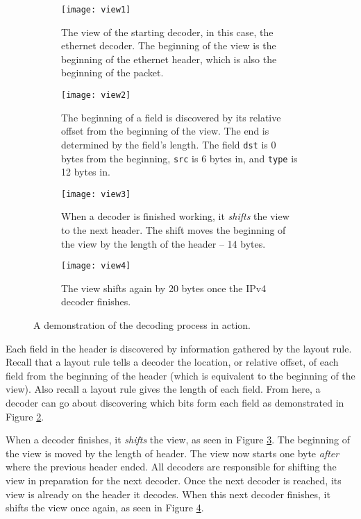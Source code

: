 \begin{figure}[ht]
\begin{subfigure}[t]{.45\textwidth}
  \centering
  \texttt{[image: view1]}
  \caption{The view of the starting decoder, in this case, the ethernet
decoder. The beginning of the view is the beginning of the ethernet
header, which is also the beginning of the packet.}
  \label{fg:view1}
\end{subfigure}%
\hfill
\begin{subfigure}[t]{.45\textwidth}
  \centering
  \texttt{[image: view2]}
  \caption{The beginning of a field is discovered by its relative offset from
the beginning of the view. The end is determined by the field's length. The
field \texttt{dst} is 0 bytes from the beginning, \texttt{src} is 6 bytes in,
and \texttt{type} is 12 bytes in.}
  \label{fg:view2}
\end{subfigure}

\begin{subfigure}[t]{.45\textwidth}
  \centering
  \texttt{[image: view3]}
  \caption{When a decoder is finished working, it \textit{shifts} the view to
the next header. The shift moves the beginning of the view by the length of the
header -- 14 bytes.}
  \label{fg:view3}
\end{subfigure}%
\hfill
\begin{subfigure}[t]{.45\textwidth}
  \centering
  \texttt{[image: view4]}
  \caption{The view shifts again by 20 bytes once the IPv4 decoder finishes.}
  \label{fg:view4}
\end{subfigure}
\caption{A demonstration of the decoding process in action.}
\label{fg:decoding}
\end{figure}

Each field in the header is discovered by information gathered by the layout
rule. Recall that a layout rule tells a decoder the location, or relative offset, of
each field from the beginning of the header (which is equivalent to the
beginning of the view). Also recall a layout rule gives the length of each
field. From here, a decoder can go about discovering which bits form each
field as demonstrated in Figure \ref{fg:view2}.

When a decoder finishes, it \textit{shifts} the view, as seen in Figure
\ref{fg:view3}. The beginning of the view is moved by the length of header. The
view now starts one byte \textit{after} where the previous header ended. All decoders are responsible for shifting the view in
preparation for the next decoder. Once the next decoder is reached, its view is
already on the header it decodes. When this next decoder finishes, it shifts the
view once again, as seen in Figure \ref{fg:view4}.

